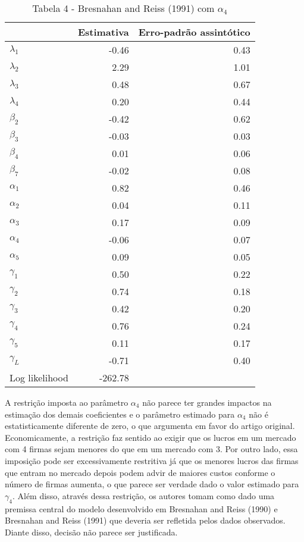 \documentclass[
  12pt,
]{article}
\begin{document}
\begin{table}[H]

\caption{\label{tab:unnamed-chunk-9}Tabela 4 - Bresnahan and Reiss (1991) com $\alpha_4$}
\centering
\begin{tabular}[t]{lrr}
\toprule
  & Estimativa & Erro-padrão assintótico\\
\midrule
$\lambda_1$ & -0.46 & 0.43\\
$\lambda_2$ & 2.29 & 1.01\\
$\lambda_3$ & 0.48 & 0.67\\
$\lambda_4$ & 0.20 & 0.44\\
$\beta_2$ & -0.42 & 0.62\\
$\beta_3$ & -0.03 & 0.03\\
$\beta_4$ & 0.01 & 0.06\\
$\beta_7$ & -0.02 & 0.08\\
$\alpha_1$ & 0.82 & 0.46\\
$\alpha_2$ & 0.04 & 0.11\\
$\alpha_3$ & 0.17 & 0.09\\
$\alpha_4$ & -0.06 & 0.07\\
$\alpha_5$ & 0.09 & 0.05\\
$\gamma_1$ & 0.50 & 0.22\\
$\gamma_2$ & 0.74 & 0.18\\
$\gamma_3$ & 0.42 & 0.20\\
$\gamma_4$ & 0.76 & 0.24\\
$\gamma_5$ & 0.11 & 0.17\\
$\gamma_L$ & -0.71 & 0.40\\
Log likelihood & -262.78 & \\
\bottomrule
\end{tabular}
\end{table}

A restrição imposta ao parâmetro \(\alpha_4\) não parece ter grandes
impactos na estimação dos demais coeficientes e o parâmetro estimado
para \(\alpha_4\) não é estatisticamente diferente de zero, o que
argumenta em favor do artigo original. Economicamente, a restrição faz
sentido ao exigir que os lucros em um mercado com 4 firmas sejam menores
do que em um mercado com 3. Por outro lado, essa imposição pode ser
excessivamente restritiva já que os menores lucros das firmas que entram
no mercado depois podem advir de maiores custos conforme o número de
firmas aumenta, o que parece ser verdade dado o valor estimado para
\(\gamma_4\). Além disso, através dessa restrição, os autores tomam como
dado uma premissa central do modelo desenvolvido em Bresnahan and Reiss
(1990) e Bresnahan and Reiss (1991) que deveria ser refletida pelos
dados observados. Diante disso, decisão não parece ser justificada.
\end{document}
